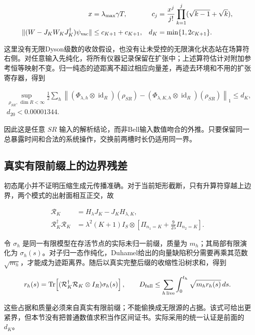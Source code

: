 \documentclass[
  11pt,
  oneside]{book}
\begin{document}
\[
\begin{aligned}
x&=\lambda_{\max}\gamma T,
&c_j&=\frac{x^j}{j!}\prod_{k=1}^j(\sqrt{k-1}+\sqrt{k}),\\
\|(W-J_KW_KJ_K^\dagger)\psi_{\rm vac}\|
&\le c_{K+1}+c_{K+1},
&d_K&=\min\{1,2c_{K+1}\}.
\end{aligned}
\]

这里没有无限Dyson级数的收敛假设，也没有让未受控的无限演化状态站在场算符右侧。对任意输入先纯化，将所有仪器记录保留在扩张中；上述算符估计对附加参考恒等映射不变。归一纯态的迹距离不超过相应向量差，再迹去环境和不用的扩张寄存器，得到

\[
\begin{gathered}
\sup_{\rho_{SR},\,\dim R<\infty}
\frac12\sum_h\left\|
(\Phi_{\lambda,h}\otimes\operatorname{id}_R)(\rho_{SR})-
(\Phi_{\lambda,K,h}\otimes\operatorname{id}_R)(\rho_{SR})
\right\|_1\le d_K,\\
d_{20}<0.00001344.
\end{gathered}
\]

因此这是任意 \(SR\)
输入的解析结论，而非Bell输入数值吻合的外推。只要保留同一总暴露时间和合法的系统操作，交换前两槽时长仍适用同一界。

\subsection{真实有限前缀上的边界残差}

初态尾小并不证明压缩生成元传播准确。对于当前矩形截断，只有升算符穿越上边界，两个模式的出射面相互正交，故

\[
\begin{aligned}
\mathcal R_K&=H_\lambda J_K-J_KH_{\lambda,K},\\
\mathcal R_K^\dagger\mathcal R_K
&=\lambda^2(K+1)I_S\otimes
\left[\Pi_{n_1=K}+\frac9{25}\Pi_{n_2=K}\right].
\end{aligned}
\]

令 \(\sigma_h\) 是同一有限模型在存活节点的实际未归一前缀，质量为
\(m_h\)；其局部有限演化为
\(\sigma_h(s)\)。对子归一态作纯化，Duhamel给出的向量缺陷积分需要再乘其范数
\(\sqrt{m_h}\)，才能成为迹距离界。随后以真实完整后缀的收缩性沿树求和，得到

\[
r_h(s)=\operatorname{Tr}\!\left[
(\mathcal R_K^\dagger\mathcal R_K\otimes I_R)\sigma_h(s)\right],
\qquad
D_{\rm full}\le\sum_{h\,\mathrm{live}}\int_0^{t_h}\sqrt{m_h r_h(s)}\,ds.
\]

这些占据和质量必须来自真实有限前缀；不能偷换成无限源的占据。该式可给出更紧界，但本节没有把普通数值求积当作区间证书。实际采用的统一认证是前面的
\(d_K\)。
\end{document}
